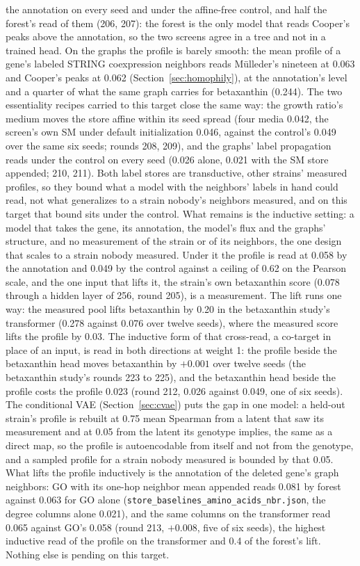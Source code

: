 the annotation on every seed and under the affine-free control, and half the forest's
read of them (206, 207): the forest is the only model that reads Cooper's peaks above
the annotation, so the two screens agree in a tree and not in a trained head. On the graphs the profile is barely smooth: the mean profile of a gene's
labeled STRING coexpression neighbors reads M\"ulleder's nineteen at 0.063 and Cooper's
peaks at 0.062 (Section~\ref{sec:homophily}), at the annotation's level and a quarter
of what the same graph carries for betaxanthin (0.244).
The two essentiality recipes carried to this target close the same way: the growth
ratio's medium moves the store affine within its seed spread (four media 0.042, the
screen's own SM under default initialization 0.046, against the control's 0.049 over
the same six seeds; rounds 208, 209), and the graphs' label propagation reads under the
control on every seed (0.026 alone, 0.021 with the SM store appended; 210, 211). Both
label stores are transductive, other strains' measured profiles, so they bound what a
model with the neighbors' labels in hand could read, not what generalizes to a strain
nobody's neighbors measured, and on this target that bound sits under the control.
What remains is the inductive setting: a model that takes the gene, its annotation, the
model's flux and the graphs' structure, and no measurement of the strain or of its
neighbors, the one design that scales to a strain nobody measured. Under it the profile
is read at 0.058 by the annotation and 0.049 by the control against a ceiling of 0.62
on the Pearson scale, and the one input that lifts it, the strain's own betaxanthin
score (0.078 through a hidden layer of 256, round 205), is a measurement. The lift runs
one way: the measured pool lifts betaxanthin by 0.20 in the betaxanthin study's
transformer (0.278 against 0.076 over twelve seeds), where the measured score lifts the
profile by 0.03. The inductive form of that cross-read, a co-target in place of an
input, is read in both directions at weight 1: the profile beside the betaxanthin head
moves betaxanthin by $+0.001$ over twelve seeds (the betaxanthin study's rounds 223 to
225), and the betaxanthin head beside the profile costs the profile 0.023 (round 212,
0.026 against 0.049, one of six seeds). The conditional VAE (Section~\ref{sec:cvae})
puts the gap in one model: a held-out strain's profile is rebuilt at 0.75 mean Spearman
from a latent that saw its measurement and at 0.05 from the latent its genotype implies,
the same as a direct map, so the profile is autoencodable from itself and not from the
genotype, and a sampled profile for a strain nobody measured is bounded by that 0.05.
What lifts the profile inductively is the annotation of the deleted gene's graph
neighbors: GO with its one-hop neighbor mean appended reads 0.081 by forest against
0.063 for GO alone (\texttt{store\_baselines\_amino\_acids\_nbr.json}, the degree
columns alone 0.021), and the same columns on the transformer read 0.065 against GO's
0.058 (round 213, $+0.008$, five of six seeds), the highest inductive read of the
profile on the transformer and 0.4 of the forest's lift. Nothing else is pending on
this target.

